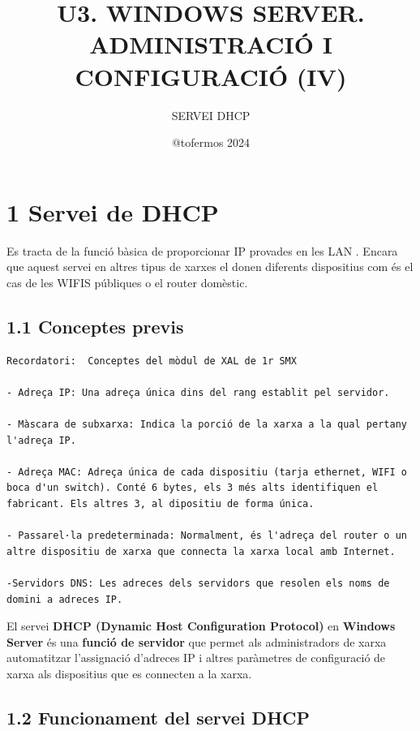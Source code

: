 \documentclass[
  a4paper,
]{article}
\title{U3. WINDOWS SERVER. ADMINISTRACIÓ I CONFIGURACIÓ (IV)}
\subtitle{SERVEI DHCP}
\author{@tofermos 2024}
\date{}
\begin{document}
\maketitle

{
\setcounter{tocdepth}{2}
\tableofcontents
}
\newpage
\renewcommand\tablename{Tabla}

\section{1 Servei de DHCP}\label{servei-de-dhcp}

Es tracta de la funció bàsica de proporcionar IP provades en les LAN .
Encara que aquest servei en altres tipus de xarxes el donen diferents
dispositius com és el cas de les WIFIS públiques o el router domèstic.

\subsection{1.1 Conceptes previs}\label{conceptes-previs}

\begin{verbatim}
Recordatori:  Conceptes del mòdul de XAL de 1r SMX

- Adreça IP: Una adreça única dins del rang establit pel servidor.

- Màscara de subxarxa: Indica la porció de la xarxa a la qual pertany l'adreça IP.

- Adreça MAC: Adreça única de cada dispositiu (tarja ethernet, WIFI o boca d'un switch). Conté 6 bytes, els 3 més alts identifiquen el fabricant. Els altres 3, al dipositiu de forma única.

- Passarel·la predeterminada: Normalment, és l'adreça del router o un altre dispositiu de xarxa que connecta la xarxa local amb Internet.

-Servidors DNS: Les adreces dels servidors que resolen els noms de domini a adreces IP.
\end{verbatim}

El servei \textbf{DHCP (Dynamic Host Configuration Protocol)} en
\textbf{Windows Server} és una \textbf{funció de servidor} que permet
als administradors de xarxa automatitzar l'assignació d'adreces IP i
altres paràmetres de configuració de xarxa als dispositius que es
connecten a la xarxa.

\subsection{1.2 Funcionament del servei
DHCP}\label{funcionament-del-servei-dhcp}
\end{document}
